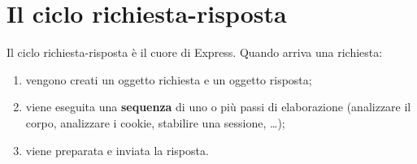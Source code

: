 \section{Il ciclo richiesta-risposta}

Il ciclo richiesta-risposta è il cuore di Express. Quando arriva una richiesta:

\begin{enumerate}
  \item vengono creati un oggetto richiesta e un oggetto risposta;
  \item viene eseguita una \textbf{sequenza} di uno o più passi di elaborazione
        (analizzare il corpo, analizzare i cookie, stabilire una sessione,
        \ldots);
  \item viene preparata e inviata la risposta.
\end{enumerate}

